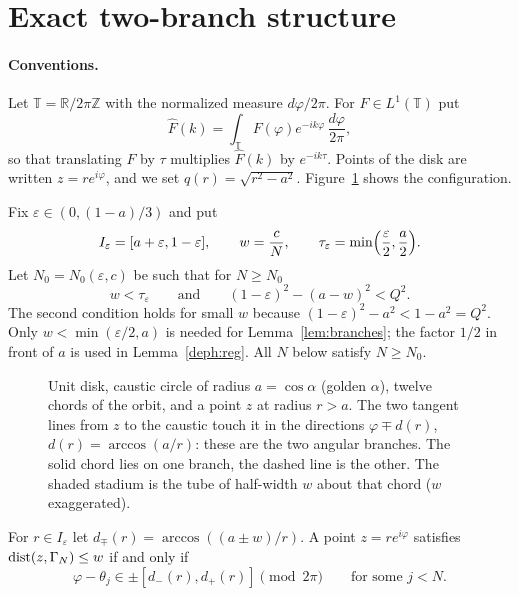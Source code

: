 \section{Exact two-branch structure}\label{sec:geometry}

\paragraph{Conventions.}
Let $\mathbb T=\mathbb R/2\pi\mathbb Z$ with the normalized measure $d\varphi/2\pi$. For $F\in L^1(\mathbb T)$ put
\[
\hat F(k)=\int_{\mathbb T}F(\varphi)e^{-ik\varphi}\,\frac{d\varphi}{2\pi},
\]
so that translating $F$ by $\tau$ multiplies $\hat F(k)$ by $e^{-ik\tau}$.
Points of the disk are written $z=re^{i\varphi}$, and we set $q(r)=\sqrt{r^2-a^2}$.
Figure~\ref{deph:fig-geometry} shows the configuration.

Fix $\varepsilon\in(0,(1-a)/3)$ and put
\[
I_\varepsilon=[a+\varepsilon,1-\varepsilon],\qquad w=\frac cN,\qquad \tau_\varepsilon=\min\Bigl(\frac\varepsilon2,\frac a2\Bigr).
\]
Let $N_0=N_0(\varepsilon,c)$ be such that for $N\ge N_0$
\begin{equation}\label{deph:N0}
w<\tau_\varepsilon\qquad\text{and}\qquad (1-\varepsilon)^2-(a-w)^2<Q^2 .
\end{equation}
The second condition holds for small $w$ because $(1-\varepsilon)^2-a^2<1-a^2=Q^2$. Only $w<\min(\varepsilon/2,a)$ is needed
for Lemma~\ref{lem:branches}; the factor $1/2$ in front of $a$ is used in Lemma~\ref{deph:reg}.
All $N$ below satisfy $N\ge N_0$.

\begin{figure}[t]
\centering
\begin{tikzpicture}[scale=0.85]

\end{tikzpicture}
\caption{Unit disk, caustic circle of radius $a=\cos\alpha$ (golden $\alpha$), twelve chords of the orbit, and a point
$z$ at radius $r>a$. The two tangent lines from $z$ to the caustic touch it in the directions $\varphi\mp d(r)$,
$d(r)=\arccos(a/r)$: these are the two angular branches. The solid chord lies on one branch, the dashed line is the other.
The shaded stadium is the tube of half-width $w$ about that chord ($w$ exaggerated).}
\label{deph:fig-geometry}
\end{figure}

\begin{lemma}\label{lem:branches}
For $r\in I_\varepsilon$ let $d_\mp(r)=\arccos((a\pm w)/r)$. A point $z=re^{i\varphi}$ satisfies $\operatorname{dist}(z,\Gamma_N)\le w$ if and only if
\[
\varphi-\theta_j\in\pm[d_-(r),d_+(r)]\pmod{2\pi}\qquad\text{for some } j<N .
\]
\end{lemma}

